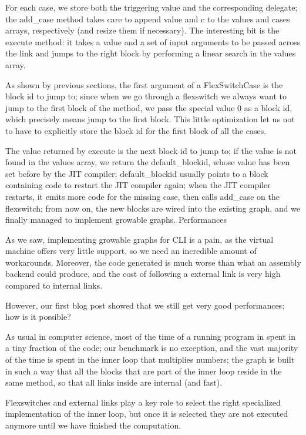 {For each case, we store both the triggering value and the corresponding delegate; the add_case method takes care to append value and c to the values and cases arrays, respectively (and resize them if necessary). The interesting bit is the execute method: it takes a value and a set of input arguments to be passed across the link and jumps to the right block by performing a linear search in the values array.

As shown by previous sections, the first argument of a FlexSwitchCase is the block id to jump to; since when we go through a flexswitch we always want to jump to the first block of the method, we pass the special value 0 as a block id, which precisely means jump to the first block. This little optimization let us not to have to explicitly store the block id for the first block of all the cases.

The value returned by execute is the next block id to jump to; if the value is not found in the values array, we return the default_blockid, whose value has been set before by the JIT compiler; default_blockid usually points to a block containing code to restart the JIT compiler again; when the JIT compiler restarts, it emits more code for the missing case, then calls add_case on the flexswitch; from now on, the new blocks are wired into the existing graph, and we finally managed to implement growable graphs.
Performances

As we saw, implementing growable graphs for CLI is a pain, as the virtual machine offers very little support, so we need an incredible amount of workarounds. Moreover, the code generated is much worse than what an assembly backend could produce, and the cost of following a external link is very high compared to internal links.

However, our first blog post showed that we still get very good performances; how is it possible?

As usual in computer science, most of the time of a running program in spent in a tiny fraction of the code; our benchmark is no exception, and the vast majority of the time is spent in the inner loop that multiplies numbers; the graph is built in such a way that all the blocks that are part of the inner loop reside in the same method, so that all links inside are internal (and fast).

Flexswitches and external links play a key role to select the right specialized implementation of the inner loop, but once it is selected they are not executed anymore until we have finished the computation.

}
